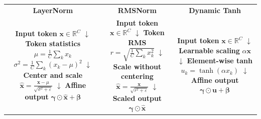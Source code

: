 \begin{center}
\small
\setlength{\fboxsep}{6pt}
\begin{tabular}{ccc}
    \textbf{LayerNorm} &
    \textbf{RMSNorm} &
    \textbf{Dynamic Tanh} \\[0.4em]
    \fbox{\parbox{0.28\textwidth}{\centering
        \textbf{Input token}\\
        \(\mathbf{x}\in\mathbb{R}^{C}\)\\[0.25em]
        \(\downarrow\)\\[0.2em]
        \textbf{Token statistics}\\
        \(\mu=\frac{1}{C}\sum_k x_k\)\\
        \(\sigma^2=\frac{1}{C}\sum_k(x_k-\mu)^2\)\\[0.2em]
        \(\downarrow\)\\[0.2em]
        \textbf{Center and scale}\\
        \(\widehat{\mathbf{x}}=
        \frac{\mathbf{x}-\mu}{\sqrt{\sigma^2+\varepsilon}}\)\\[0.2em]
        \(\downarrow\)\\[0.2em]
        \textbf{Affine output}\\
        \(\boldsymbol{\gamma}\odot\widehat{\mathbf{x}}+
        \boldsymbol{\beta}\)}} &
    \fbox{\parbox{0.28\textwidth}{\centering
        \textbf{Input token}\\
        \(\mathbf{x}\in\mathbb{R}^{C}\)\\[0.25em]
        \(\downarrow\)\\[0.2em]
        \textbf{Token RMS}\\
        \(r=\sqrt{\frac{1}{C}\sum_k x_k^2}\)\\[0.2em]
        \(\downarrow\)\\[0.2em]
        \textbf{Scale without centering}\\
        \(\widehat{\mathbf{x}}=\frac{\mathbf{x}}{\sqrt{r^2+\varepsilon}}\)\\[0.2em]
        \(\downarrow\)\\[0.2em]
        \textbf{Scaled output}\\
        \(\boldsymbol{\gamma}\odot\widehat{\mathbf{x}}\)}} &
    \fbox{\parbox{0.28\textwidth}{\centering
        \textbf{Input token}\\
        \(\mathbf{x}\in\mathbb{R}^{C}\)\\[0.25em]
        \(\downarrow\)\\[0.2em]
        \textbf{Learnable scaling}\\
        \(\alpha\mathbf{x}\)\\[0.2em]
        \(\downarrow\)\\[0.2em]
        \textbf{Element-wise tanh}\\
        \(u_k=\tanh(\alpha x_k)\)\\[0.2em]
        \(\downarrow\)\\[0.2em]
        \textbf{Affine output}\\
        \(\boldsymbol{\gamma}\odot\mathbf{u}+
        \boldsymbol{\beta}\)}}
\end{tabular}
\end{center}
